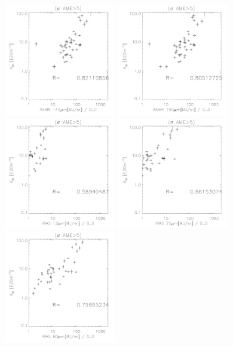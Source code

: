 \begin{figure}[!htb]
  \includegraphics[width=50mm]{IRIntG0MWAmp/akari140G0_Asp_sp.pdf}
  \includegraphics[width=50mm]{IRIntG0MWAmp/akari160G0_Asp_sp.pdf}
  \includegraphics[width=50mm]{IRIntG0MWAmp/iras12G0_Asp_sp.pdf}
  \includegraphics[width=50mm]{IRIntG0MWAmp/iras25G0_Asp_sp.pdf}
  \includegraphics[width=50mm]{IRIntG0MWAmp/iras60G0_Asp_sp.pdf}

\end{figure}
